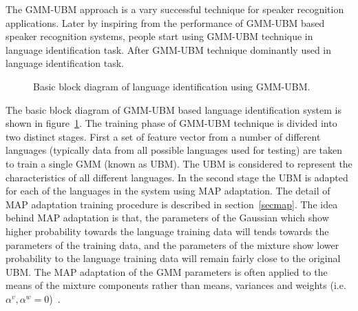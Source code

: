 \begin{spacing}{1.5}
The GMM-UBM approach is a vary successful technique for speaker recognition applications. Later by inspiring from the performance of GMM-UBM based speaker recognition systems, people start using GMM-UBM technique in language identification task. After GMM-UBM technique dominantly used in language identification task.
\begin{figure}[h]
\caption{Basic block diagram of language identification using GMM-UBM.}
\label{ubm}
\end{figure}

The basic block diagram of GMM-UBM based language identification system is shown in figure~\ref{ubm}. The training phase of GMM-UBM technique is divided into two distinct stages. First a set of feature vector from a number of different languages (typically data from all possible languages used for testing) are taken to train a single GMM (known as UBM). The UBM is considered to represent the characteristics of all different languages. In the second stage the UBM is adapted for each of the languages in the system using MAP adaptation. The detail of MAP adaptation training procedure is described in section~\ref{secmap}. The idea behind MAP adaptation is that, the parameters of the Gaussian which show higher probability towards the language training data will tends towards the parameters of the training data, and the parameters of the mixture show lower probability to the language training data will remain fairly close to the original UBM. The MAP adaptation of the GMM parameters is often applied to the means of the mixture components rather than means, variances and weights (i.e. $\alpha^{v},\alpha^{w}=0$)~\cite{ambikairajah2011language}.      


\end{spacing}
